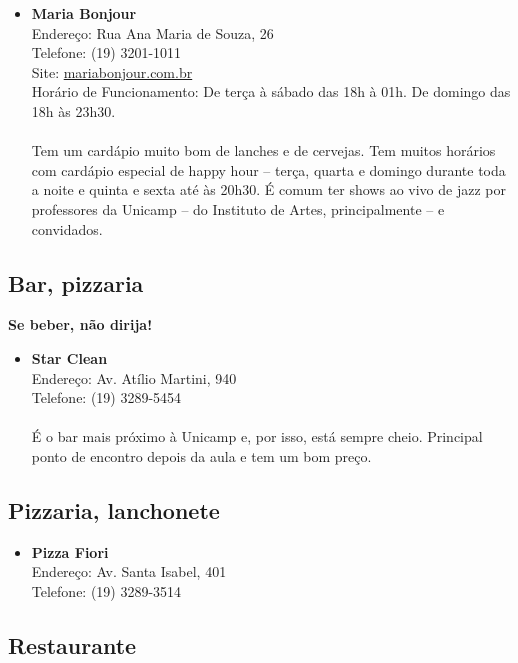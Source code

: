 \begin{itemize}
\item \textbf{Maria Bonjour}
  \\Endereço: Rua Ana Maria de Souza, 26
  \\Telefone: (19) 3201-1011
  \\Site: \url{mariabonjour.com.br}
  \\Horário de Funcionamento: De terça à sábado das 18h à 01h. De domingo das
  18h às 23h30.
  \\
  \\Tem um cardápio muito bom de lanches e de cervejas. Tem muitos horários com
  cardápio especial de happy hour -- terça, quarta e domingo durante toda a
  noite e quinta e sexta até às 20h30. É comum ter shows ao vivo de jazz por
  professores da Unicamp -- do Instituto de Artes, principalmente -- e
  convidados.

\end{itemize}

\subsection{Bar, pizzaria}

\textbf{Se beber, não dirija!}

\begin{itemize}
\item \textbf{Star Clean}
  \\Endereço: Av. Atílio Martini, 940
  \\Telefone: (19) 3289-5454
  \\
  \\É o bar mais próximo à Unicamp e, por isso, está sempre cheio. Principal
  ponto de encontro depois da aula e tem um bom preço.
\end{itemize}

\subsection{Pizzaria, lanchonete}

\begin{itemize}
\item \textbf{Pizza Fiori}
  \\Endereço: Av. Santa Isabel, 401
  \\Telefone: (19) 3289-3514
\end{itemize}

\subsection{Restaurante}

